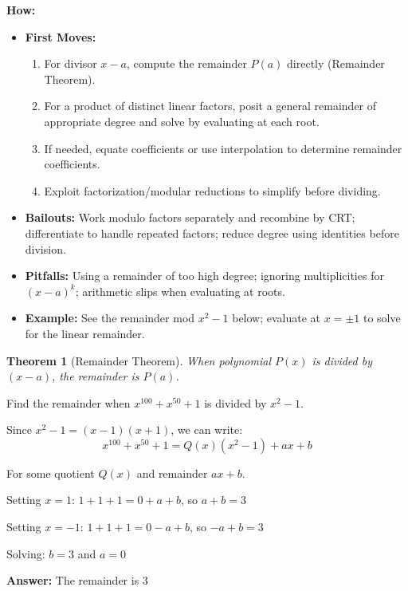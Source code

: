 \documentclass[12pt]{article}
\newtheorem{theorem}{Theorem}[section]
\newenvironment{problem}[1]
{\begin{tcolorbox}[colback=blue!5!white,colframe=blue!75!black,title={#1}]}{\end{tcolorbox}}
\newenvironment{solution}
{\begin{tcolorbox}[colback=green!5!white,colframe=green!75!black,title={Solution}]}{\end{tcolorbox}}
\begin{document}
\textbf{How:}
\begin{itemize}
    \item \textbf{First Moves:}
    \begin{enumerate}[nosep]
        \item For divisor \(x-a\), compute the remainder \(P(a)\) directly (Remainder Theorem).
        \item For a product of distinct linear factors, posit a general remainder of appropriate degree and solve by evaluating at each root.
        \item If needed, equate coefficients or use interpolation to determine remainder coefficients.
        \item Exploit factorization/modular reductions to simplify before dividing.
    \end{enumerate}
    \item \textbf{Bailouts:} Work modulo factors separately and recombine by CRT; differentiate to handle repeated factors; reduce degree using identities before division.
    \item \textbf{Pitfalls:} Using a remainder of too high degree; ignoring multiplicities for \((x-a)^k\); arithmetic slips when evaluating at roots.
    \item \textbf{Example:} See the remainder mod \(x^2-1\) below; evaluate at \(x=\pm1\) to solve for the linear remainder.
\end{itemize}

\begin{theorem}[Remainder Theorem]
When polynomial $P(x)$ is divided by $(x - a)$, the remainder is $P(a)$.
\end{theorem}

\begin{problem}{Example: Polynomial Remainder}
Find the remainder when $x^{100} + x^{50} + 1$ is divided by $x^2 - 1$.
\end{problem}

\begin{solution}
Since $x^2 - 1 = (x-1)(x+1)$, we can write:
$$x^{100} + x^{50} + 1 = Q(x)(x^2 - 1) + ax + b$$

For some quotient $Q(x)$ and remainder $ax + b$.

Setting $x = 1$: $1 + 1 + 1 = 0 + a + b$, so $a + b = 3$

Setting $x = -1$: $1 + 1 + 1 = 0 - a + b$, so $-a + b = 3$

Solving: $b = 3$ and $a = 0$

\textbf{Answer:} The remainder is $3$
\end{solution}
\end{document}
